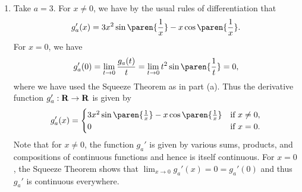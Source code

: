 \documentclass{lew98_solutions}
\begin{document}
\begin{solution}
\begin{enumerate}
        \item Take \( a = 3 \). For \( x \neq 0 \), we have by the usual rules of differentiation that
        \[
            g_a'(x) = 3 x^2 \sin \paren{\frac{1}{x}} - x \cos \paren{\frac{1}{x}}.
        \]
        For \( x = 0 \), we have
        \[
            g_a'(0) = \lim_{t \to 0} \frac{g_a(t)}{t} = \lim_{t \to 0} t^2 \sin \paren{\frac{1}{t}} = 0,
        \]
        where we have used the Squeeze Theorem as in part (a). Thus the derivative function \( g_a' : \mathbf{R} \to \mathbf{R} \) is given by
        \[
            g_a'(x) = \begin{cases}
                3 x^2 \sin \paren{\frac{1}{x}} - x \cos \paren{\frac{1}{x}} & \text{if } x \neq 0, \\
                0 & \text{if } x = 0.
            \end{cases}
        \]
        Note that for \( x \neq 0 \), the function \( g_a' \) is given by various sums, products, and compositions of continuous functions and hence is itself continuous. For \( x = 0 \), the Squeeze Theorem shows that \( \lim_{x \to 0} g_a'(x) = 0 = g_a'(0) \) and thus \( g_a' \) is continuous everywhere.


\end{enumerate}
\end{solution}
\end{document}
